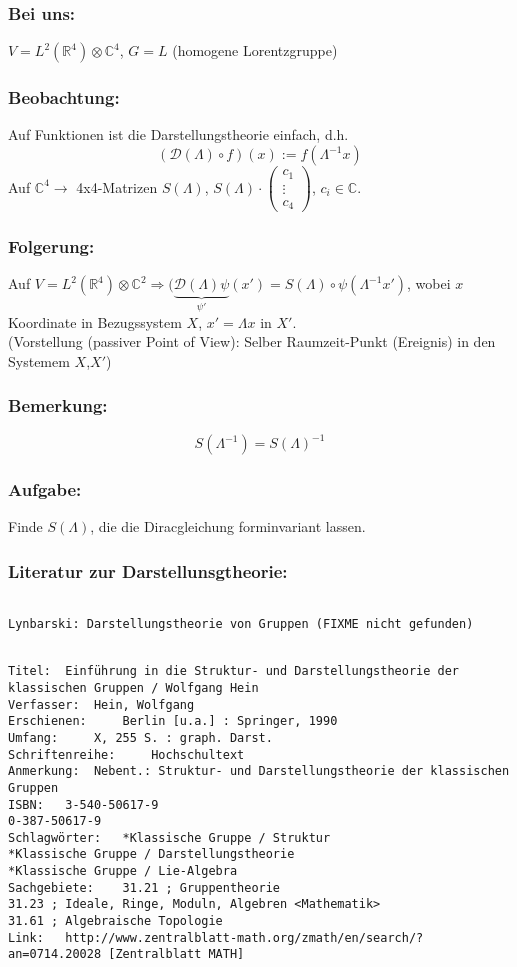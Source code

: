 \documentclass[twoside,a4paper]{scrartcl}
\newcommand{\R}{\mathbb{R}}
\newcommand{\C}{\mathbb{C}}
\newcommand{\D}{\mathcal{D}}
\renewcommand{\1}{\mathds{1}}
\newcommand{\Ra}{\Rightarrow}
\newcommand{\ra}{\rightarrow}
\renewcommand{\L}{\Lambda}
\renewcommand{\R}{\mathbb{R}}
\renewcommand{\C}{\mathbb{C}}
\begin{document}
\subsubsection*{Bei uns:}
$V=L^2(\R^4)\otimes \C^4$, $G=L$ (homogene Lorentzgruppe)
\subsubsection*{Beobachtung:}
Auf Funktionen ist die Darstellungstheorie einfach, d.h. 
$$(\D(\L)\circ f)(x):=f(\L^{-1}x)$$
Auf $\C^4 \ra$ 4x4-Matrizen $S(\L)$, $S(\L)\cdot \begin{pmatrix}c_1 \\ \vdots \\ c_4\end{pmatrix}$, $c_i \in \C$.
\subsubsection*{Folgerung:}
Auf $V=L^2(\R^4)\otimes \C^2 \Ra (\underbrace{\D(\L)\psi}_{\psi'}(x')=S(\L)\circ \psi(\L^{-1}x')$, wobei $x$ Koordinate in Bezugssystem $X$, $x'=\L x$ in $X'$.\\
(Vorstellung (passiver Point of View): Selber Raumzeit-Punkt (Ereignis) in den Systemem $X$,$X'$)
\subsubsection*{Bemerkung:}
$$S(\L^{-1})=S(\L)^{-1}$$
\subsubsection*{Aufgabe:}
Finde $S(\L)$, die die Diracgleichung forminvariant lassen.
\subsubsection*{Literatur zur Darstellunsgtheorie:}
\begin{tiny}
\begin{verbatim}

Lynbarski: Darstellungstheorie von Gruppen (FIXME nicht gefunden)
\end{verbatim}
\end{tiny}


\begin{tiny}
\begin{verbatim}

Titel: 	Einführung in die Struktur- und Darstellungstheorie der klassischen Gruppen / Wolfgang Hein
Verfasser: 	Hein, Wolfgang
Erschienen: 	Berlin [u.a.] : Springer, 1990
Umfang: 	X, 255 S. : graph. Darst.
Schriftenreihe: 	Hochschultext
Anmerkung: 	Nebent.: Struktur- und Darstellungstheorie der klassischen Gruppen
ISBN: 	3-540-50617-9
0-387-50617-9
Schlagwörter: 	*Klassische Gruppe / Struktur
*Klassische Gruppe / Darstellungstheorie
*Klassische Gruppe / Lie-Algebra
Sachgebiete: 	31.21 ; Gruppentheorie
31.23 ; Ideale, Ringe, Moduln, Algebren <Mathematik>
31.61 ; Algebraische Topologie
Link: 	http://www.zentralblatt-math.org/zmath/en/search/?an=0714.20028 [Zentralblatt MATH]
\end{verbatim}
\end{tiny}
\end{document}
